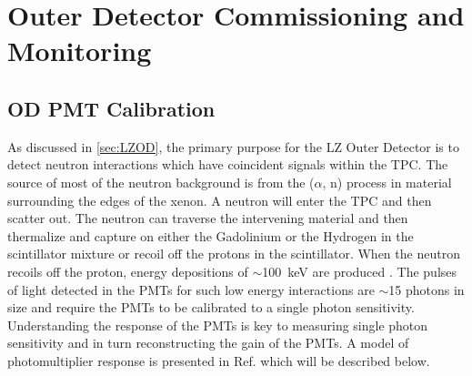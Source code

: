 \chapter{Outer Detector Commissioning and Monitoring}\label{chap:ODCommissioning}
\section{OD PMT Calibration}
As discussed in \ref{sec:LZOD}, the primary purpose for the LZ Outer Detector is to detect neutron interactions which have coincident signals within the TPC. The source of most of the neutron background is from the ($\alpha$, n) process in material surrounding the edges of the xenon. A neutron will enter the TPC and then scatter out. The neutron can traverse the intervening material and then thermalize and capture on either the Gadolinium or the Hydrogen in the scintillator mixture or recoil off the protons in the scintillator. When the neutron recoils off the proton, energy depositions of $\sim$100~keV are produced \cite{LZNIMA}. The pulses of light detected in the PMTs for such low energy interactions are $\sim$15 photons in size and require the PMTs to be calibrated to a single photon sensitivity. Understanding the response of the PMTs is key to measuring single photon sensitivity and in turn reconstructing the gain of the PMTs. A model of photomultiplier response is presented in Ref.\cite{BELLAMY1994468} which will be described below.
